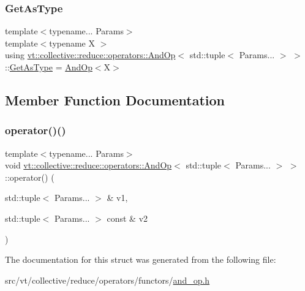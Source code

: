 \subsubsection{\texorpdfstring{Get\+As\+Type}{GetAsType}}
{\footnotesize\ttfamily template$<$typename... Params$>$ \\
template$<$typename X $>$ \\
using \hyperlink{structvt_1_1collective_1_1reduce_1_1operators_1_1_and_op}{vt\+::collective\+::reduce\+::operators\+::\+And\+Op}$<$ std\+::tuple$<$ Params... $>$ $>$\+::\hyperlink{structvt_1_1collective_1_1reduce_1_1operators_1_1_and_op_3_01std_1_1tuple_3_01_params_8_8_8_01_4_01_4_a0f8d55e9537d1fa1d81d8aa2d232a4af}{Get\+As\+Type} =  \hyperlink{structvt_1_1collective_1_1reduce_1_1operators_1_1_and_op}{And\+Op}$<$X$>$}



\subsection{Member Function Documentation}
\mbox{\label{structvt_1_1collective_1_1reduce_1_1operators_1_1_and_op_3_01std_1_1tuple_3_01_params_8_8_8_01_4_01_4_a5ec08ad20d1897c9bec0cace68106258}} 
\subsubsection{\texorpdfstring{operator()()}{operator()()}}
{\footnotesize\ttfamily template$<$typename... Params$>$ \\
void \hyperlink{structvt_1_1collective_1_1reduce_1_1operators_1_1_and_op}{vt\+::collective\+::reduce\+::operators\+::\+And\+Op}$<$ std\+::tuple$<$ Params... $>$ $>$\+::operator() (\begin{DoxyParamCaption}\item[{std\+::tuple$<$ Params... $>$ \&}]{v1,  }\item[{std\+::tuple$<$ Params... $>$ const \&}]{v2 }\end{DoxyParamCaption})\hspace{0.3cm}{\ttfamily [inline]}}



The documentation for this struct was generated from the following file\+:\begin{DoxyCompactItemize}
\item 
src/vt/collective/reduce/operators/functors/\hyperlink{and__op_8h}{and\+\_\+op.\+h}\end{DoxyCompactItemize}
